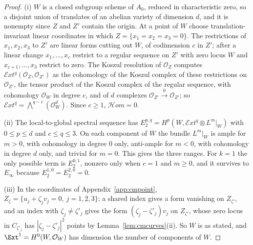 \begin{proof}
(i) $W$ is a closed subgroup scheme of $A_{0}$, reduced in characteristic zero, so a disjoint union of translates of an abelian variety of dimension $d$, and it is nonempty since $Z$ and $Z'$ contain the origin. At a point of $W$ choose translation-invariant linear coordinates in which $Z=\{x_{1}=x_{2}=x_{3}=0\}$. The restrictions of $x_{1},x_{2},x_{3}$ to $Z'$ are linear forms cutting out $W$, of codimension $c$ in $Z'$; after a linear change $x_{1},\dots,x_{c}$ restrict to a regular sequence on $Z'$ with zero locus $W$ and $x_{c+1},\dots,x_{3}$ restrict to zero. The Koszul resolution of $\mathcal{O}_{Z}$ computes $\mathcal{E}xt^{q}(\mathcal{O}_{Z},\mathcal{O}_{Z'})$ as the cohomology of the Koszul complex of these restrictions on $\mathcal{O}_{Z'}$, the tensor product of the Koszul complex of the regular sequence, with cohomology $\mathcal{O}_{W}$ in degree $c$, and of $d$ complexes $\mathcal{O}_{Z'}\xrightarrow{0}\mathcal{O}_{Z'}$; so $\mathcal{E}xt^{q}=\bigwedge^{q-c}(\mathcal{O}_{W}^{d})$. Since $c\ge1$, $\mathcal{H}om=0$.

(ii) The local-to-global spectral sequence has $E_{2}^{p,q}=H^{p}(W,\mathcal{E}xt^{q}\otimes L^{m}|_{W})$ with $0\le p\le d$ and $c\le q\le3$. On each component of $W$ the bundle $L^{m}|_{W}$ is ample for $m>0$, with cohomology in degree $0$ only, anti-ample for $m<0$, with cohomology in degree $d$ only, and trivial for $m=0$. This gives the three ranges. For $k=1$ the only possible term is $E_{2}^{0,1}$, nonzero only when $c=1$ and $m\ge0$, and it survives to $E_{\infty}$ because $E_{2}^{1,0}=E_{2}^{2,0}=0$.

(iii) In the coordinates of Appendix~\ref{app:cmpoint}, $Z_{\zeta}=\{u_{j}+\zeta_{j}v_{j}=0,\ j=1,2,3\}$; a shared index gives a form vanishing on $Z_{\zeta'}$, and an index with $\zeta_{j}\ne\zeta'_{j}$ gives the form $(\zeta_{j}-\zeta'_{j})v_{j}$ on $Z_{\zeta'}$, whose zero locus in $C_{\zeta'_{j}}$ has $|\zeta_{j}-\zeta'_{j}|^{2}$ points by Lemma~\ref{lem:cmcurves}(ii). So $W$ is as stated, and $\Ext^{1}=H^{0}(W,\mathcal{O}_{W})$ has dimension the number of components of $W$.
\end{proof}

